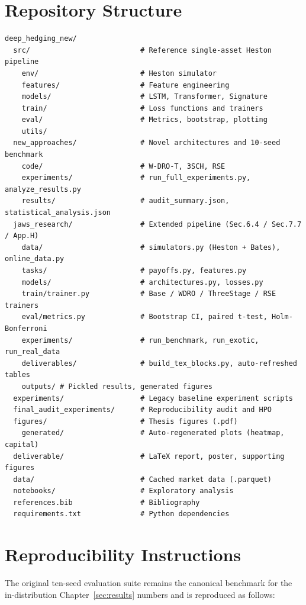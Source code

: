 \documentclass[11pt,oneside]{report}
\begin{document}
\chapter{Repository Structure}
\label{app:repo}

\begin{verbatim}
deep_hedging_new/
  src/                          # Reference single-asset Heston pipeline
    env/                        # Heston simulator
    features/                   # Feature engineering
    models/                     # LSTM, Transformer, Signature
    train/                      # Loss functions and trainers
    eval/                       # Metrics, bootstrap, plotting
    utils/
  new_approaches/               # Novel architectures and 10-seed benchmark
    code/                       # W-DRO-T, 3SCH, RSE
    experiments/                # run_full_experiments.py, analyze_results.py
    results/                    # audit_summary.json, statistical_analysis.json
  jaws_research/                # Extended pipeline (Sec.6.4 / Sec.7.7 / App.H)
    data/                       # simulators.py (Heston + Bates), online_data.py
    tasks/                      # payoffs.py, features.py
    models/                     # architectures.py, losses.py
    train/trainer.py            # Base / WDRO / ThreeStage / RSE trainers
    eval/metrics.py             # Bootstrap CI, paired t-test, Holm-Bonferroni
    experiments/                # run_benchmark, run_exotic, run_real_data
    deliverables/               # build_tex_blocks.py, auto-refreshed tables
    outputs/ # Pickled results, generated figures
  experiments/                  # Legacy baseline experiment scripts
  final_audit_experiments/      # Reproducibility audit and HPO
  figures/                      # Thesis figures (.pdf)
    generated/                  # Auto-regenerated plots (heatmap, capital)
  deliverable/                  # LaTeX report, poster, supporting figures
  data/                         # Cached market data (.parquet)
  notebooks/                    # Exploratory analysis
  references.bib                # Bibliography
  requirements.txt              # Python dependencies
\end{verbatim}

\chapter{Reproducibility Instructions}
\label{app:reproduce}

The original ten-seed evaluation suite remains the canonical benchmark for the in-distribution Chapter~\ref{sec:results} numbers and is reproduced as follows:
\end{document}
